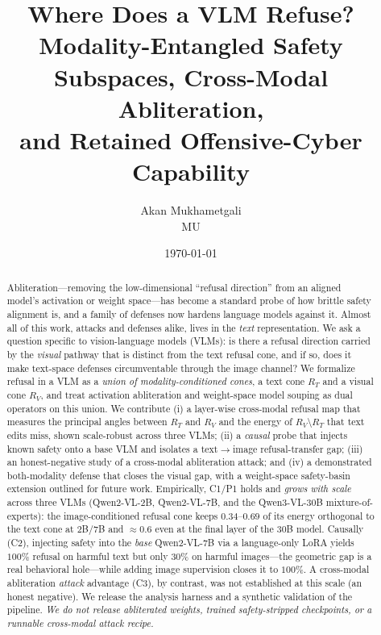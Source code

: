 \documentclass[11pt]{article}
\title{\textbf{Where Does a VLM Refuse?}\\
Modality-Entangled Safety Subspaces, Cross-Modal Abliteration,\\
and Retained Offensive-Cyber Capability}
\author{Akan Mukhametgali \\ MU}
\date{\today}
\begin{document}
\maketitle

\begin{abstract}
Abliteration---removing the low-dimensional ``refusal direction'' from an aligned
model's activation or weight space---has become a standard probe of how brittle
safety alignment is, and a family of defenses now hardens language models against
it. Almost all of this work, attacks and defenses alike, lives in the \emph{text}
representation. We ask a question specific to vision-language models (VLMs): is
there a refusal direction carried by the \emph{visual} pathway that is distinct
from the text refusal cone, and if so, does it make text-space defenses
circumventable through the image channel? We formalize refusal in a VLM as a
\emph{union of modality-conditioned cones}, a text cone $R_T$ and a visual cone
$R_V$, and treat activation abliteration and weight-space model souping as dual
operators on this union. We contribute (i) a layer-wise cross-modal refusal map
that measures the principal angles between $R_T$ and $R_V$ and the energy of
$R_V\setminus R_T$ that text edits miss, shown scale-robust across three VLMs; (ii) a
\emph{causal} probe that injects known safety onto a base VLM and isolates a
text$\rightarrow$image refusal-transfer gap; (iii) an honest-negative study of a
cross-modal abliteration attack; and (iv) a demonstrated both-modality defense that
closes the visual gap, with a weight-space safety-basin extension outlined for future
work. Empirically, C1/P1 holds and \emph{grows with scale} across three
VLMs (Qwen2-VL-2B, Qwen2-VL-7B, and the Qwen3-VL-30B mixture-of-experts): the
image-conditioned refusal cone keeps $0.34$--$0.69$ of its energy orthogonal to the
text cone at 2B/7B and $\approx0.6$ even at the final layer of the 30B model. Causally
(C2), injecting safety into the \emph{base} Qwen2-VL-7B via a language-only LoRA yields
$100\%$ refusal on harmful text but only $30\%$ on harmful images---the geometric gap
is a real behavioral hole---while adding image supervision closes it to $100\%$. A
cross-modal abliteration \emph{attack} advantage (C3), by contrast, was not established
at this scale (an honest negative). We release the analysis harness and a synthetic
validation of the pipeline. \emph{We do not release abliterated weights, trained
safety-stripped checkpoints, or a runnable cross-modal attack recipe.}
\end{abstract}
\end{document}
